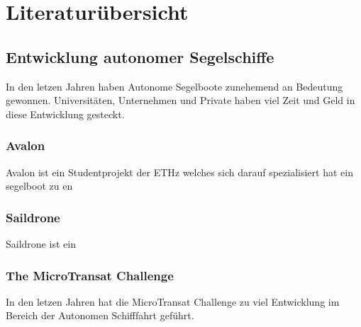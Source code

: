 

\chapter{Literaturübersicht }
\label{chap:literaturübersicht}


\section{Entwicklung autonomer Segelschiffe}
In den letzen Jahren haben Autonome Segelboote zunehemend an Bedeutung gewonnen. Universitäten, Unternehmen und Private haben viel Zeit und Geld in diese Entwicklung gesteckt.

\subsection{Avalon}
Avalon ist ein Studentprojekt der ETHz welches sich darauf spezialisiert hat ein segelboot zu en

\subsection{Saildrone}
Saildrone ist ein 

\subsection{The MicroTransat Challenge}
In den letzen Jahren hat die MicroTransat Challenge zu viel Entwicklung im Bereich der Autonomen Schifffahrt geführt.  



